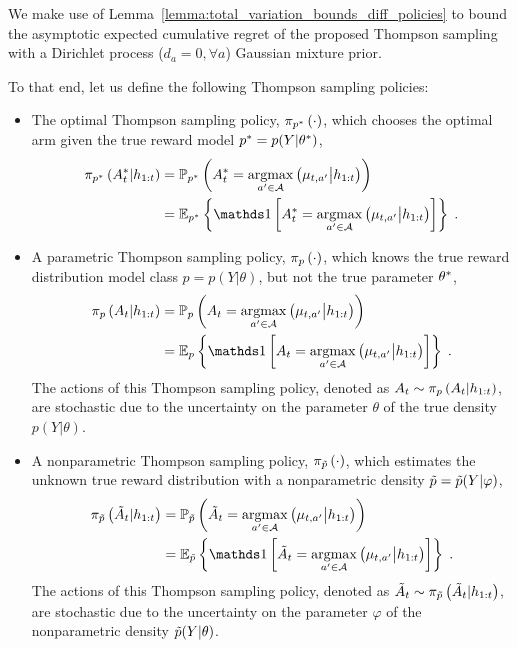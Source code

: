 We make use of Lemma~\ref{lemma:total_variation_bounds_diff_policies} to bound the asymptotic expected cumulative regret of the proposed Thompson sampling with a Dirichlet process (\ie $d_a=0, \forall a$) Gaussian mixture prior. 

To that end, let us define the following Thompson sampling policies:
\begin{itemize}
	\item The optimal Thompson sampling policy, $\pi_{p^*}\left( \cdot \right)$, which chooses the optimal arm given the true reward model $p^*=p(Y|\theta^*)$,
	\begin{align}
	\myPistar{\Astar_t|h_{1:t}} &=\myProb{\pstar}{\Astar_t=\argmax_{a^\prime \in \A} \left(\mu_{t,a^\prime} \big| h_{1:t}\right)} \nonumber \\ 
	&= \eValue{\pstar}{\myind{\Astar_t=\argmax_{a^\prime \in \A} \left(\mu_{t,a^\prime} \big| h_{1:t}\right) }} \;.
	\end{align}
	\item A parametric Thompson sampling policy, $\pi_{p}\left( \cdot \right)$, which knows the true reward distribution model class $p=p(Y|\theta)$, but not the true parameter $\theta^*$,
	\begin{align}
	\myPi{p}{A_t|h_{1:t}}&=\myProb{p}{A_t=\argmax_{a^\prime \in \A} \left(\mu_{t,a^\prime} \big| h_{1:t}\right)} \nonumber \\ 
	& =\eValue{p}{\myind{A_t=\argmax_{a^\prime \in \A} \left(\mu_{t,a^\prime} \big| h_{1:t}\right) }} \;.
	\end{align}
	The actions of this Thompson sampling policy, denoted as $A_t\sim \pi_{p}\left( A_t|h_{1:t} \right)$, are stochastic due to the uncertainty on the parameter $\theta$ of the true density $p(Y|\theta)$.
	\item A nonparametric Thompson sampling policy, $\pi_{\tilde{p}}\left( \cdot \right)$, which estimates the unknown true reward distribution with a nonparametric density $\tilde{p}=\tilde{p}(Y|\varphi)$,
	\begin{align}
	\myPitilde{\Atilde_t|h_{1:t}} &=\myProb{\ptilde}{\Atilde_t=\argmax_{a^\prime \in \A} \left(\mu_{t,a^\prime} \big| h_{1:t}\right)} \nonumber \\ 
	&=\eValue{\ptilde}{\myind{\Atilde_t=\argmax_{a^\prime \in \A} \left(\mu_{t,a^\prime} \big| h_{1:t}\right) }} \;.
	\end{align}
	The actions of this Thompson sampling policy, denoted as $\tilde{A}_t\sim \pi_{\tilde{p}}\left( \tilde{A}_t|h_{1:t} \right)$, are stochastic due to the uncertainty on the parameter $\varphi$ of the nonparametric density $\tilde{p}(Y|\theta)$.
\end{itemize}

